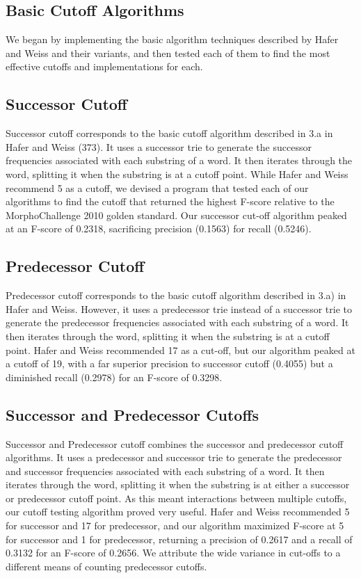 \documentclass[11pt,letterpaper]{article}
\begin{document}
\subsection{Basic Cutoff Algorithms}

We began by implementing the basic algorithm techniques described by Hafer and Weiss and their variants, and then tested each of them to find the most effective cutoffs and implementations for each.




\subsection{Successor Cutoff} 

  Successor cutoff corresponds to the basic cutoff algorithm described in 3.a in Hafer and Weiss (373). It uses a successor trie to generate the successor frequencies associated with each substring of a word. It then iterates through the word, splitting it when the substring is at a cutoff point. While Hafer and Weiss recommend 5 as a cutoff, we devised a program that tested each of our algorithms to find the cutoff that returned the highest F-score relative to the MorphoChallenge 2010 golden standard. Our successor cut-off algorithm peaked at an F-score of 0.2318, sacrificing precision (0.1563) for recall (0.5246). 
  

\subsection{Predecessor Cutoff}
  Predecessor cutoff corresponds to the basic cutoff algorithm described in 3.a) in Hafer and Weiss. However, it uses a predecessor trie instead of a successor trie to generate the predecessor frequencies associated with each substring of a word. It then iterates through the word, splitting it when the substring is at a cutoff point. Hafer and Weiss recommended 17 as a cut-off, but our algorithm peaked at a cutoff of 19, with a far superior precision to successor cutoff (0.4055) but a diminished recall (0.2978) for an F-score of 0.3298.
  
  
\subsection{Successor and Predecessor Cutoffs}
 Successor and Predecessor cutoff combines the successor and predecessor cutoff algorithms. It uses a predecessor and successor trie to generate the predecessor and successor frequencies associated with each substring of a word. It then iterates through the word, splitting it when the substring is at either a successor or predecessor cutoff point. As this meant interactions between multiple cutoffs, our cutoff testing algorithm proved very useful. Hafer and Weiss recommended 5 for successor and 17 for predecessor, and our algorithm maximized F-score at 5 for successor and 1 for predecessor, returning a precision of 0.2617 and a recall of 0.3132 for an F-score of 0.2656. We attribute the wide variance in cut-offs to a different means of counting predecessor cutoffs. 
 
\end{document}
